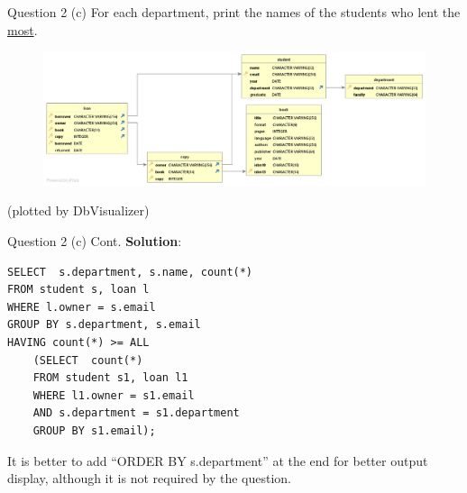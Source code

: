 \begin{frame}[fragile]{Question 2 (c)}
For each department, print the names of the students who lent the \underline{most}.
\begin{figure}
	\includegraphics[width=1\textwidth]{t1/images/t1-end.png}
\end{figure}\vspace{-10pt}
{\tiny(plotted by DbVisualizer)}
\end{frame}


\begin{frame}[fragile]{Question 2 (c) Cont.}
\textbf{Solution}:
	
\begin{lstlisting}
SELECT  s.department, s.name, count(*)
FROM student s, loan l
WHERE l.owner = s.email
GROUP BY s.department, s.email
HAVING count(*) >= ALL
	(SELECT  count(*) 
	FROM student s1, loan l1
	WHERE l1.owner = s1.email
	AND s.department = s1.department
	GROUP BY s1.email);
\end{lstlisting}\vspace{5pt}

\begin{block}{}
It is better to add ``ORDER BY s.department'' at the end for better output display, although it is not required by the question.	
\end{block}
\end{frame}



